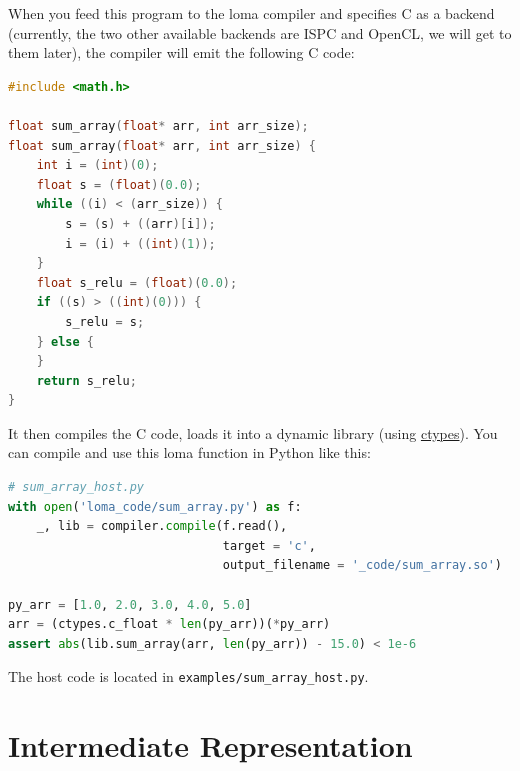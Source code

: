 When you feed this program to the loma compiler and specifies C as a backend (currently, the two other available backends are ISPC and OpenCL, we will get to them later), the compiler will emit the following C code:
\begin{lstlisting}[language=c]
#include <math.h>
        
float sum_array(float* arr, int arr_size);
float sum_array(float* arr, int arr_size) {
    int i = (int)(0);
    float s = (float)(0.0);
    while ((i) < (arr_size)) {
        s = (s) + ((arr)[i]);
        i = (i) + ((int)(1));
    }
    float s_relu = (float)(0.0);
    if ((s) > ((int)(0))) {
        s_relu = s;
    } else {
    }
    return s_relu;
}
\end{lstlisting}

It then compiles the C code, loads it into a dynamic library (using \href{https://docs.python.org/3/library/ctypes.html}{ctypes}). You can compile and use this loma function in Python like this:
\begin{lstlisting}[language=python]
# sum_array_host.py
with open('loma_code/sum_array.py') as f:
    _, lib = compiler.compile(f.read(),
                              target = 'c',
                              output_filename = '_code/sum_array.so')

py_arr = [1.0, 2.0, 3.0, 4.0, 5.0]
arr = (ctypes.c_float * len(py_arr))(*py_arr)
assert abs(lib.sum_array(arr, len(py_arr)) - 15.0) < 1e-6
\end{lstlisting}
The host code is located in \lstinline{examples/sum_array_host.py}.

\section{Intermediate Representation}
\label{sec:IR}

